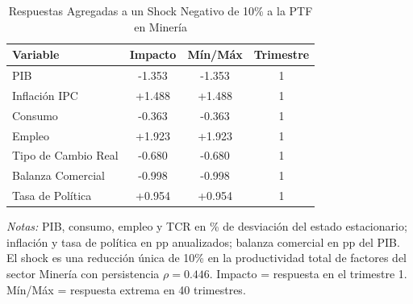 \begin{table}[htbp]
\centering
\caption{Respuestas Agregadas a un Shock Negativo de 10\% a la PTF en Minería}
\label{tab:min_agg}
\begin{threeparttable}
\begin{tabular}{@{}l c c c@{}}
\toprule
Variable & Impacto & Mín/Máx & Trimestre \\
\midrule
PIB & -1.353 & -1.353 & 1 \\
Inflación IPC & +1.488 & +1.488 & 1 \\
Consumo & -0.363 & -0.363 & 1 \\
Empleo & +1.923 & +1.923 & 1 \\
Tipo de Cambio Real & -0.680 & -0.680 & 1 \\
Balanza Comercial & -0.998 & -0.998 & 1 \\
Tasa de Política & +0.954 & +0.954 & 1 \\
\bottomrule
\end{tabular}
\begin{tablenotes}[flushleft]
\footnotesize
\item \textit{Notas:} PIB, consumo, empleo y TCR en \% de desviación del estado estacionario; inflación y tasa de política en pp anualizados; balanza comercial en pp del PIB. El shock es una reducción única de 10\% en la productividad total de factores del sector Minería con persistencia $\rho = 0.446$. Impacto = respuesta en el trimestre 1. Mín/Máx = respuesta extrema en 40 trimestres.
\end{tablenotes}
\end{threeparttable}
\end{table}
